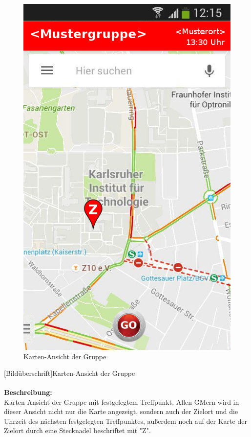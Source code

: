 \begin{figure}[H]
	\caption{Karten-Ansicht der Gruppe}
\begin{center}
	\includegraphics[scale =0.5]{resources/images/map.png}
\end{center}
\end{figure}
[Bildüberschrift]Karten-Ansicht der Gruppe\\ \\
\textbf{Beschreibung:}\\
Karten-Ansicht der Gruppe mit festgelegtem Treffpunkt. Allen GMern wird in dieser Ansicht nicht nur die Karte angezeigt, sondern auch der Zielort und die Uhrzeit des nächsten festgelegten Treffpunktes, außerdem noch auf der Karte der Zielort durch eine Stecknadel beschriftet mit "Z".\\
